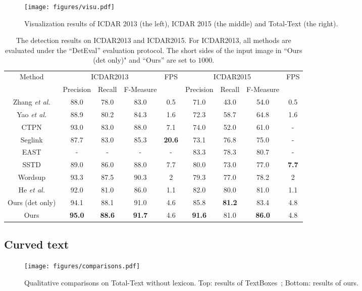 \documentclass[runningheads]{llncs}
\begin{document}
\begin{figure}[!tbp]
\begin{center}
\texttt{[image: figures/visu.pdf]}
\end{center}
\caption{Visualization results of ICDAR 2013 (the left), ICDAR 2015 (the middle) and Total-Text (the right).}
\label{fig:visu}
\end{figure}


\begin{table}[ht]
\begin{centering}
\caption{The detection results on ICDAR2013 and ICDAR2015. For ICDAR2013, all methods are evaluated  under the ``DetEval” evaluation protocol. The short sides of the input image in ``Ours (det only)" and ``Ours'' are set to $1000$.}
\label{tab_detection}
\begin{tabular}{|c|c|c|c|c|c|c|c|c|}
\hline 
\multirow{2}{*}{Method} & \multicolumn{3}{c|}{ICDAR2013} & \multirow{2}{*}{FPS} & \multicolumn{3}{c|}{ICDAR2015} & \multirow{2}{*}{FPS}\tabularnewline
\cline{2-4} \cline{6-8} 
 & Precision & Recall & F-Measure &  & Precision & Recall & F-Measure & \tabularnewline
\hline 
\hline
Zhang \emph{et al.} \cite{zhang2016multi} & 88.0 & 78.0 & 83.0 & 0.5 & 71.0 & 43.0 &  54.0 & 0.5 \tabularnewline
\hline 
Yao \emph{et al.} \cite{yao2016scene} & 88.9 & 80.2 & 84.3 & 1.6 & 72.3 & 58.7 & 64.8 & 1.6  \tabularnewline
\hline 
CTPN \cite{tian2016detecting} & 93.0 & 83.0  & 88.0 & 7.1 & 74.0 & 52.0 & 61.0 & -  \tabularnewline
\hline 
Seglink \cite{shi2017detecting} & 87.7 & 83.0 & 85.3  & \textbf{20.6} & 73.1 & 76.8 & 75.0 & - \tabularnewline
\hline 
EAST \cite{zhou2017east} & - & - & - & - & 83.3 & 78.3 & 80.7 & -   \tabularnewline
\hline 
SSTD \cite{he2017single} & 89.0 & 86.0  & 88.0 & 7.7 & 80.0 & 73.0 &  77.0 & \textbf{7.7} \tabularnewline
\hline 
Wordsup \cite{hu2017wordsup} & 93.3 & 87.5 & 90.3 & 2 & 79.3 & 77.0 & 78.2 & 2  \tabularnewline
\hline 
He \emph{et al.} \cite{he2017deep} & 92.0 & 81.0 & 86.0 & 1.1 & 82.0 & 80.0 & 81.0 & 1.1 \tabularnewline
\hline 
\hline
Ours (det only) &94.1  &88.1  &91.0  &4.6   &85.8   &\textbf{81.2}  &83.4  &4.8 \tabularnewline
\hline 
Ours &\textbf{95.0}  &\textbf{88.6}  &\textbf{91.7}  &4.6   &\textbf{91.6}  &81.0  &\textbf{86.0} &4.8 \tabularnewline
\hline
\end{tabular}
\par\end{centering}
\end{table}

\subsection{Curved text}
\begin{figure}[!tp]
\begin{center}
\texttt{[image: figures/comparisons.pdf]}
\end{center}
\caption{Qualitative comparisons on Total-Text without lexicon. Top: results of TextBoxes~\cite{liao2017textboxes}; Bottom: results of ours.}
\label{fig:visu_compare}
\end{figure}
\end{document}
